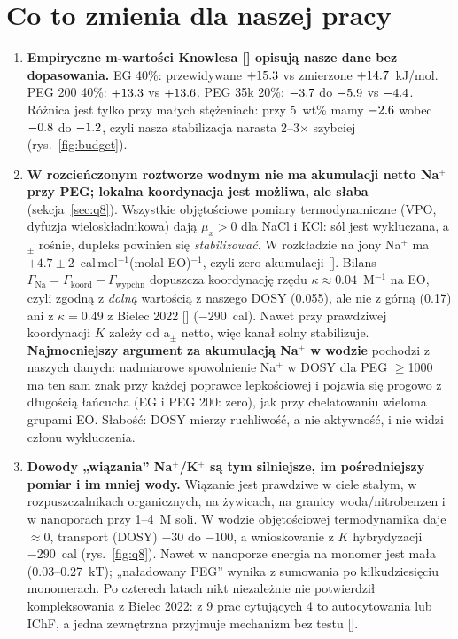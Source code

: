 \documentclass[10pt,a4paper]{article}
\newcommand{\citone}[1]{\citsep\ref{#1}\gdef\citsep{,\,}}
\newcommand{\cit}[1]{[\gdef\citsep{}\forcsvlist{\citone}{#1}]}
\begin{document}
\section*{Co to zmienia dla naszej pracy}
\begin{enumerate}[leftmargin=*]
\item \textbf{Empiryczne m-wartości Knowlesa \cit{b:kn11} opisują nasze dane bez dopasowania.} EG 40\%: przewidywane $+15.3$ vs zmierzone $+14.7$~kJ/mol. PEG 200 40\%: $+13.3$ vs $+13.6$. PEG 35k 20\%: $-3.7$ do $-5.9$ vs $-4.4$. Różnica jest tylko przy małych stężeniach: przy 5~wt\% mamy $-2.6$ wobec $-0.8$ do $-1.2$, czyli nasza stabilizacja narasta 2--3× szybciej (rys.~\ref{fig:budget}).
\item \textbf{W rozcieńczonym roztworze wodnym nie ma akumulacji netto Na$^+$ przy PEG; lokalna koordynacja jest możliwa, ale słaba} (sekcja~\ref{sec:q8}). Wszystkie objętościowe pomiary termodynamiczne (VPO, dyfuzja wieloskładnikowa) dają $\mu_x>0$ dla NaCl i KCl: sól jest wykluczana, a$_\pm$ rośnie, dupleks powinien się \emph{stabilizować}. W rozkładzie na jony Na$^+$ ma $+4.7\pm2$~cal\,mol$^{-1}$(molal EO)$^{-1}$, czyli zero akumulacji \cit{b:kn15}. Bilans $\Gamma_\text{Na}=\Gamma_\text{koord}-\Gamma_\text{wypchn}$ dopuszcza koordynację rzędu $\kappa\approx0.04$~M$^{-1}$ na EO, czyli zgodną z \emph{dolną} wartością z naszego DOSY (0.055), ale nie z górną (0.17) ani z $\kappa=0.49$ z Bielec 2022 \cit{b:bielec22} ($-290$~cal). Nawet przy prawdziwej koordynacji $K$ zależy od a$_\pm$ netto, więc kanał solny stabilizuje. \textbf{Najmocniejszy argument za akumulacją Na$^+$ w wodzie} pochodzi z naszych danych: nadmiarowe spowolnienie Na$^+$ w DOSY dla PEG $\ge$1000 ma ten sam znak przy każdej poprawce lepkościowej i pojawia się progowo z długością łańcucha (EG i PEG 200: zero), jak przy chelatowaniu wieloma grupami EO. Słabość: DOSY mierzy ruchliwość, a nie aktywność, i nie widzi członu wykluczenia.
\item \textbf{Dowody „wiązania” Na$^+$/K$^+$ są tym silniejsze, im pośredniejszy pomiar i im mniej wody.} Wiązanie jest prawdziwe w ciele stałym, w rozpuszczalnikach organicznych, na żywicach, na granicy woda/nitrobenzen i w nanoporach przy 1--4~M soli. W wodzie objętościowej termodynamika daje $\approx0$, transport (DOSY) $-30$ do $-100$, a wnioskowanie z $K$ hybrydyzacji $-290$~cal (rys.~\ref{fig:q8}). Nawet w nanoporze energia na monomer jest mała (0.03--0.27~kT); „naładowany PEG” wynika z sumowania po kilkudziesięciu monomerach. Po czterech latach nikt niezależnie nie potwierdził kompleksowania z Bielec 2022: z 9 prac cytujących 4 to autocytowania lub IChF, a jedna zewnętrzna przyjmuje mechanizm bez testu \cit{b:silva}.

\end{enumerate}
\end{document}
